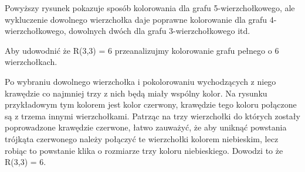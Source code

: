 \documentclass[11pt]{article}
\begin{document}
\begin{enumerate}
Powyższy rysunek pokazuje sposób kolorowania dla grafu 5-wierzchołkowego, ale wykluczenie dowolnego wierzchołka daje poprawne kolorowanie dla grafu 4-wierzchołkowego, dowolnych dwóch dla grafu 3-wierzchołkowego itd.

Aby udowodnić że R(3,3) = 6 przeanalizujmy kolorowanie grafu pełnego o 6 wierzchołkach. 


\begin{figure}[H]
  \centering
    \caption{}
 \end{figure}

 \begin{figure}[H]
  \centering
    \caption{}
 \end{figure}



Po wybraniu dowolnego wierzchołka i pokolorowaniu wychodzących z niego krawędzie co najmniej trzy z nich będą miały wspólny kolor. Na rysunku przykładowym tym kolorem jest kolor czerwony, krawędzie tego koloru połączone są z trzema innymi wierzchołkami. Patrząc na trzy wierzchołki do których zostały poprowadzone krawędzie czerwone, łatwo zauważyć, że aby uniknąć powstania trójkąta czerwonego należy połączyć te wierzchołki kolorem niebieskim, lecz robiąc to powstanie klika o rozmiarze trzy koloru niebieskiego. Dowodzi to że R(3,3) = 6.
    




\end{enumerate}
\end{document}
